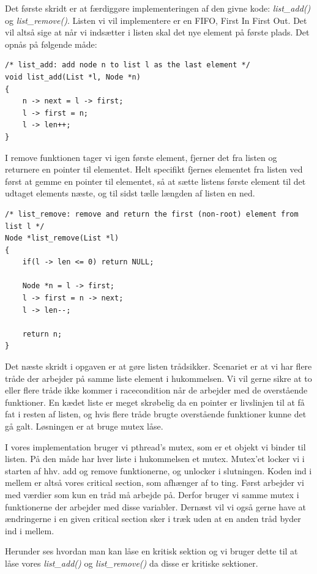 \documentclass[danish]{report}
\begin{document}
Det første skridt er at færdiggøre implementeringen af den givne kode: \textit{list\_add()} og \textit{list\_remove()}. Listen vi vil implementere er en FIFO, First In First Out. Det vil altså sige at når vi indsætter i listen skal det nye element på første plads. Det opnås på følgende måde:

\begin{lstlisting}    
/* list_add: add node n to list l as the last element */
void list_add(List *l, Node *n)
{
	n -> next = l -> first;
	l -> first = n;
	l -> len++;
}
\end{lstlisting}

I remove funktionen tager vi igen første element, fjerner det fra listen og returnere en pointer til elementet. Helt specifikt fjernes elementet fra listen ved først at gemme en pointer til elementet, så at sætte listens første element til det udtaget elements næste, og til sidst tælle længden af listen en ned.

\begin{lstlisting}    
/* list_remove: remove and return the first (non-root) element from list l */
Node *list_remove(List *l)
{
	if(l -> len <= 0) return NULL;

	Node *n = l -> first;
	l -> first = n -> next;
	l -> len--;

	return n;
}
\end{lstlisting}

Det næste skridt i opgaven er at gøre listen trådsikker. Scenariet er at vi har flere tråde der arbejder på samme liste element i hukommelsen. Vi vil gerne sikre at to eller flere tråde ikke kommer i racecondition når de arbejder med de overstående funktioner. En kædet liste er meget skrøbelig da en pointer er livslinjen til at få fat i resten af listen, og hvis flere tråde brugte overstående funktioner kunne det gå galt. Løsningen er at bruge mutex låse.

I vores implementation bruger vi pthread's mutex, som er et objekt vi binder til listen. På den måde har hver liste i hukommelsen et mutex. Mutex'et locker vi i starten af hhv. add og remove funktionerne, og unlocker i slutningen. Koden ind i mellem er altså vores critical section, som afhænger af to ting. Først arbejder vi med værdier som kun en tråd må arbejde på. Derfor bruger vi samme mutex i funktionerne der arbejder med disse variabler. Dernæst vil vi også gerne have at ændringerne i en given critical section sker i træk uden at en anden tråd byder ind i mellem.

Herunder ses hvordan man kan låse en kritisk sektion og vi bruger dette til at låse vores \textit{list\_add()} og \textit{list\_remove()} da disse er kritiske sektioner. 
\end{document}
